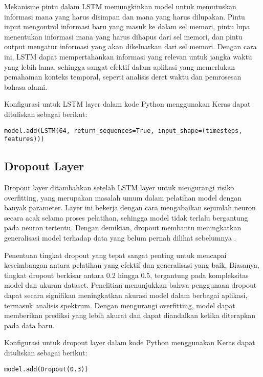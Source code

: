 \par Mekanisme pintu dalam LSTM memungkinkan model untuk memutuskan informasi mana yang harus disimpan dan mana yang harus dilupakan. Pintu input mengontrol informasi baru yang masuk ke dalam sel memori, pintu lupa menentukan informasi mana yang harus dihapus dari sel memori, dan pintu output mengatur informasi yang akan dikeluarkan dari sel memori. Dengan cara ini, LSTM dapat mempertahankan informasi yang relevan untuk jangka waktu yang lebih lama, sehingga sangat efektif dalam aplikasi yang memerlukan pemahaman konteks temporal, seperti analisis deret waktu dan pemrosesan bahasa alami.

\par Konfigurasi untuk LSTM layer dalam kode Python menggunakan Keras dapat dituliskan sebagai berikut:

\lstinline[]|model.add(LSTM(64, return_sequences=True, input_shape=(timesteps, features)))|

\subsection{Dropout Layer}
\par Dropout layer ditambahkan setelah LSTM layer untuk mengurangi risiko overfitting, yang merupakan masalah umum dalam pelatihan model dengan banyak parameter. Layer ini bekerja dengan cara mengabaikan sejumlah neuron secara acak selama proses pelatihan, sehingga model tidak terlalu bergantung pada neuron tertentu. Dengan demikian, dropout membantu meningkatkan generalisasi model terhadap data yang belum pernah dilihat sebelumnya \parencite{bengio2012}.

\par Penentuan tingkat dropout yang tepat sangat penting untuk mencapai keseimbangan antara pelatihan yang efektif dan generalisasi yang baik. Biasanya, tingkat dropout berkisar antara 0.2 hingga 0.5, tergantung pada kompleksitas model dan ukuran dataset. Penelitian menunjukkan bahwa penggunaan dropout dapat secara signifikan meningkatkan akurasi model dalam berbagai aplikasi, termasuk analisis spektrum. Dengan mengurangi overfitting, model dapat memberikan prediksi yang lebih akurat dan dapat diandalkan ketika diterapkan pada data baru.

\par Konfigurasi untuk dropout layer dalam kode Python menggunakan Keras dapat dituliskan sebagai berikut:
    
\lstinline[]|model.add(Dropout(0.3))|
  

